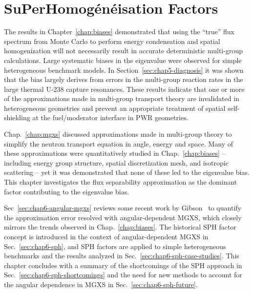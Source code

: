 \chapter{SuPerHomog\'{e}n\'{e}isation Factors}
\label{chap:sph}

The results in Chapter~\ref{chap:biases} demonstrated that using the ``true'' flux spectrum from Monte Carlo to perform energy condensation and spatial homogenization will not necessarily result in accurate deterministic multi-group calculations. Large systematic biases in the eigenvalue were observed for simple heterogeneous benchmark models. In Section~\ref{sec:chap5-diagnosis} it was shown that the bias largely derives from errors in the multi-group reaction rates in the large thermal U-238 capture resonances. These results indicate that one or more of the approximations made in multi-group transport theory are invalidated in heterogeneous geometries and prevent an appropriate treatment of spatial self-shielding at the fuel/moderator interface in \ac{PWR} geometries.



Chap.~\ref{chap:mgxs} discussed approximations made in multi-group theory to simplify the neutron transport equation in angle, energy and space. Many of these approximations were quantitatively studied in Chap.~\ref{chap:biases} -- including energy group structure, spatial discretization mesh, and isotropic scattering -- yet it was demonstrated that none of these led to the eigenvalue bias. This chapter investigates the flux separability approximation as the dominant factor contributing to the eigenvalue bias.

Sec~\ref{sec:chap6-angular-mgxs} reviews some recent work by Gibson~\cite{gibson2016thesis} to quantify the approximation error resolved with angular-dependent \ac{MGXS}, which closely mirrors the trends observed in Chap.~\ref{chap:biases}. The historical \ac{SPH} factor concept is introduced in the context of angular-dependent \ac{MGXS} in Sec.~\ref{sec:chap6-sph}, and \ac{SPH} factors are applied to simple heterogeneous benchmarks and the results analyzed in Sec.~\ref{sec:chap6-sph-case-studies}. This chapter concludes with a summary of the shortcomings of the \ac{SPH} approach in Sec.~\ref{sec:chap6-sph-shortcomings} and the need for new methods to account for the angular dependence in \ac{MGXS} in Sec.~\ref{sec:chap6-sph-future}.

